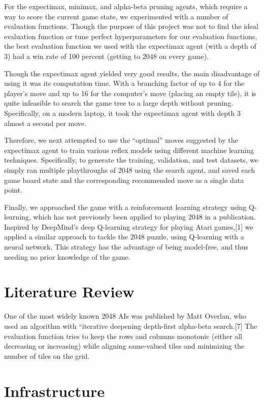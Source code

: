 \documentclass[9pt,twocolumn]{article}
\begin{document}
For the expectimax, minimax, and alpha-beta pruning agents, which require a way to score the current game state, we experimented with a number of evaluation functions. Though the purpose of this project was not to find the ideal evaluation function or tune perfect hyperparameters for our evaluation functions, the best evaluation function we used with the expectimax agent (with a depth of 3) had a win rate of 100 percent (getting to 2048 on every game).

Though the expectimax agent yielded very good results, the main disadvantage of using it was its computation time. With a branching factor of up to 4 for the player’s move and up to 16 for the computer’s move (placing an empty tile), it is quite infeasible to search the game tree to a large depth without pruning. Specifically, on a modern laptop, it took the expectimax agent with depth 3 almost a second per move.

Therefore, we next attempted to use the “optimal” moves suggested by the expectimax agent to train various reflex models using different machine learning techniques. Specifically, to generate the training, validation, and test datasets, we simply ran multiple playthroughs of 2048 using the search agent, and saved each game board state and the corresponding recommended move as a single data point.

Finally, we approached the game with a reinforcement learning strategy using Q-learning, which has not previously been applied to playing 2048 in a publication. Inspired by DeepMind's deep Q-learning strategy for playing Atari games,[1] we applied a similar approach to tackle the 2048 puzzle, using Q-learning with a neural network. This strategy has the advantage of being model-free, and thus needing no prior knowledge of the game.

\section{Literature Review}

One of the most widely known 2048 AIs was published by Matt Overlan, who used an algorithm with “iterative deepening depth-first alpha-beta search.[7] The evaluation function tries to keep the rows and columns monotonic (either all decreasing or increasing) while aligning same-valued tiles and minimizing the number of tiles on the grid.

\section{Infrastructure}
\end{document}
